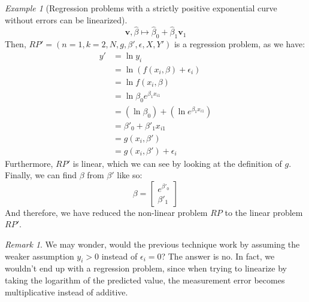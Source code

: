 \documentclass{article}
\theoremstyle{definition}
\theoremstyle{remark}
\newtheorem*{remark}{Remark}
\theoremstyle{example}
\newtheorem{example}{Example}[section]
\newcommand{\vv}{\mathbf{v}}
\newcommand{\betat}{\hat{\beta}}
\begin{document}
\begin{example}[Regression problems with a strictly positive exponential curve without errors can be linearized]
				$$\vv, \betat \mapsto \betat_0 + \betat_1 \vv_1$$
		Then, $RP' = (n=1, k=2, N, g, \beta', \epsilon, X, Y')$ is a regression problem, as we have:
		\begin{align*}
				y' &= \ln y_i\\
				   &= \ln (f(x_i, \beta) + \epsilon_i)\\
				   &= \ln f(x_i, \beta)\\
				   &= \ln \beta_0 e^{\beta_1 x_{i1}}\\
				   &= (\ln \beta_0) + (\ln e^{\beta_1 x_{i1}})\\
				   &= \beta'_0 + \beta'_1 x_{i1}\\
				   &= g(x_i, \beta')\\
				   &= g(x_i, \beta') + \epsilon_i
		\end{align*}
		Furthermore, $RP'$ is linear, which we can see by looking at the definition of $g$. Finally, we can find $\beta$ from $\beta'$ like so:
				$$\beta = \begin{bmatrix} e^{\beta'_0} \\ \beta'_1 \end{bmatrix}$$
		And therefore, we have reduced the non-linear problem $RP$ to the linear problem $RP'$.
\end{example}

\begin{remark}
		We may wonder, would the previous technique work by assuming the weaker assumption $y_i > 0$ instead of $\epsilon_i = 0$? The answer is no. In fact, we wouldn't end up with a regression problem, since when trying to linearize by taking the logarithm of the predicted value, the measurement error becomes multiplicative instead of additive.
\end{remark}
\end{document}
